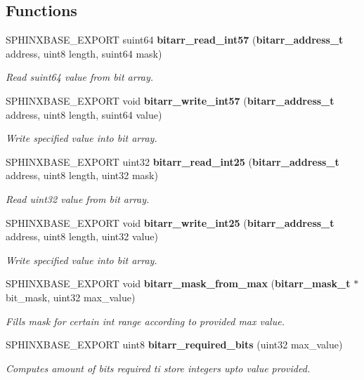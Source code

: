 \subsection*{Functions}
\begin{DoxyCompactItemize}
\item 
S\-P\-H\-I\-N\-X\-B\-A\-S\-E\-\_\-\-E\-X\-P\-O\-R\-T suint64 {\bf bitarr\-\_\-read\-\_\-int57} ({\bf bitarr\-\_\-address\-\_\-t} address, uint8 length, suint64 mask)
\begin{DoxyCompactList}\small\item\em Read suint64 value from bit array. \end{DoxyCompactList}\item 
S\-P\-H\-I\-N\-X\-B\-A\-S\-E\-\_\-\-E\-X\-P\-O\-R\-T void {\bf bitarr\-\_\-write\-\_\-int57} ({\bf bitarr\-\_\-address\-\_\-t} address, uint8 length, suint64 value)
\begin{DoxyCompactList}\small\item\em Write specified value into bit array. \end{DoxyCompactList}\item 
S\-P\-H\-I\-N\-X\-B\-A\-S\-E\-\_\-\-E\-X\-P\-O\-R\-T uint32 {\bf bitarr\-\_\-read\-\_\-int25} ({\bf bitarr\-\_\-address\-\_\-t} address, uint8 length, uint32 mask)
\begin{DoxyCompactList}\small\item\em Read uint32 value from bit array. \end{DoxyCompactList}\item 
S\-P\-H\-I\-N\-X\-B\-A\-S\-E\-\_\-\-E\-X\-P\-O\-R\-T void {\bf bitarr\-\_\-write\-\_\-int25} ({\bf bitarr\-\_\-address\-\_\-t} address, uint8 length, uint32 value)
\begin{DoxyCompactList}\small\item\em Write specified value into bit array. \end{DoxyCompactList}\item 
S\-P\-H\-I\-N\-X\-B\-A\-S\-E\-\_\-\-E\-X\-P\-O\-R\-T void {\bf bitarr\-\_\-mask\-\_\-from\-\_\-max} ({\bf bitarr\-\_\-mask\-\_\-t} $\ast$bit\-\_\-mask, uint32 max\-\_\-value)
\begin{DoxyCompactList}\small\item\em Fills mask for certain int range according to provided max value. \end{DoxyCompactList}\item 
S\-P\-H\-I\-N\-X\-B\-A\-S\-E\-\_\-\-E\-X\-P\-O\-R\-T uint8 {\bf bitarr\-\_\-required\-\_\-bits} (uint32 max\-\_\-value)
\begin{DoxyCompactList}\small\item\em Computes amount of bits required ti store integers upto value provided. \end{DoxyCompactList}\end{DoxyCompactItemize}


